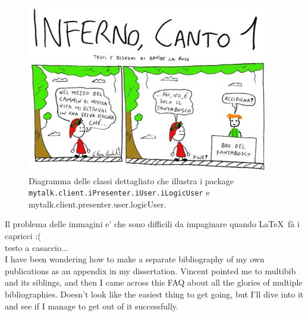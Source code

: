 \documentclass[12pt,a4paper]{article}
\begin{document}
\begin{center}
\begin{figure}[h]
\centering
\label{f1-inferno}
\includegraphics[scale=0.75]{inferno.jpeg}
\caption{Diagramma delle classi dettagliato che illustra i package
\nolinkurl{mytalk.client.iPresenter.iUser.iLogicUser} e mytalk.client.presenter.user.logicUser.}
\end{figure}
\end{center}

Il problema delle  immagini e' che sono difficili da impaginare quando \LaTeX \ f\`{a} i capricci :(
\\
testo a casaccio...\cite{webRTC}
\\
I have been wondering how to make a separate bibliography of my own publications as an appendix in my dissertation. Vincent pointed me to multibib and its siblings, and then I came across this FAQ about all the glories of multiple bibliographies. Doesn’t look like the easiest thing to get going, but I’ll dive into it and see if I manage to get out of it successfully.\cite{som}

%

%
\end{document}
